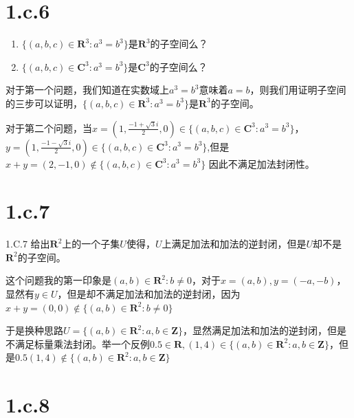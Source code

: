 \documentclass[10pt,a4paper,UTF8]{article}
\begin{document}
\section*{1.c.6}
\label{sec:org6570699}


\begin{problem}
\begin{enumerate}
\item \(\{(a,b,c)\in \mathbf{R}^{3}:a^{3} = b^{3}\}\)是\(\mathbf{R}^{3}\)的子空间么？
\item \(\{(a,b,c)\in \mathbf{C}^{3}:a^{3} = b^{3}\}\)是\(\mathbf{C}^{3}\)的子空间么？
\end{enumerate}
\end{problem}

\begin{answer}
对于第一个问题，我们知道在实数域上\(a^{3}=b^{3}\)意味着\(a=b\)，则我们用证明子空间的三步可以证明，\(\{(a,b,c)\in \mathbf{R}^{3}:a^{3} = b^{3}\}\)是\(\mathbf{R}^{3}\)的子空间。

对于第二个问题，当\(x=(1,\frac{-1 + \sqrt{3}i}{2},0) \in \{(a,b,c)\in \mathbf{C}^{3}:a^{3} = b^{3}\}\)，\(y= (1,\frac{-1 - \sqrt{3}i}{2},0) \in \{(a,b,c)\in \mathbf{C}^{3}:a^{3} = b^{3}\}\),但是\(x+y = (2,-1,0)\notin \{(a,b,c)\in \mathbf{C}^{3}:a^{3} = b^{3}\}\)
因此不满足加法封闭性。
\end{answer}

\section*{1.c.7}
\label{sec:org938e705}


\begin{problem}
1.C.7 给出\(\mathbf{R}^{2}\)上的一个子集\(U\)使得，\(U\)上满足加法和加法的逆封闭，但是\(U\)却不是\(\mathbf{R}^{2}\)的子空间。
\end{problem}

\begin{answer}
这个问题我的第一印象是\((a,b)\in \mathbf{R}^{2}:b\neq 0\)，对于\(x=(a,b),y=(-a,-b)\)，显然有\(y\in U\)，但是却不满足加法和加法的逆封闭，因为\(x+y = (0,0)\notin \{(a,b)\in \mathbf{R}^{2}: b\neq 0\}\)

于是换种思路\(U = \{(a,b)\in \mathbf{R}^{2}: a,b\in \mathbf{Z}\}\)，显然满足加法和加法的逆封闭，但是不满足标量乘法封闭。举一个反例\(0.5\in \mathbf{R},(1,4)\in \{(a,b)\in \mathbf{R}^{2}:a,b\in \mathbf{Z}\}\)，但是\(0.5(1,4)\notin \{(a,b)\in \mathbf{R}^{2}:a,b\in \mathbf{Z}\}\)
\end{answer}
\section*{1.c.8}
\label{sec:orge0b4195}
\end{document}
